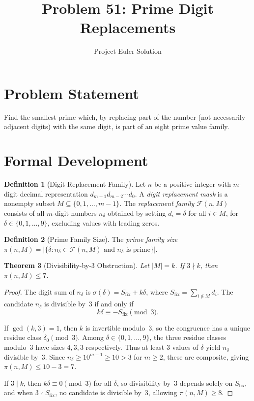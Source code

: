 \documentclass[12pt]{article}
\title{Problem 51: Prime Digit Replacements}
\author{Project Euler Solution}
\date{}
\newtheorem{theorem}{Theorem}
\theoremstyle{definition}
\newtheorem{definition}[theorem]{Definition}
\begin{document}
\maketitle

\section{Problem Statement}
Find the smallest prime which, by replacing part of the number (not necessarily adjacent digits) with the same digit, is part of an eight prime value family.

\section{Formal Development}

\begin{definition}[Digit Replacement Family]
Let $n$ be a positive integer with $m$-digit decimal representation $d_{m-1} d_{m-2} \cdots d_0$. A \emph{digit replacement mask} is a nonempty subset $M \subseteq \{0, 1, \ldots, m-1\}$. The \emph{replacement family} $\mathcal{F}(n, M)$ consists of all $m$-digit numbers $n_\delta$ obtained by setting $d_i = \delta$ for all $i \in M$, for $\delta \in \{0, 1, \ldots, 9\}$, excluding values with leading zeros.
\end{definition}

\begin{definition}[Prime Family Size]
The \emph{prime family size} $\pi(n, M) = |\{\delta : n_\delta \in \mathcal{F}(n, M) \text{ and } n_\delta \text{ is prime}\}|$.
\end{definition}

\begin{theorem}[Divisibility-by-3 Obstruction]
\label{thm:div3}
Let $|M| = k$. If $3 \nmid k$, then $\pi(n, M) \leq 7$.
\end{theorem}

\begin{proof}
The digit sum of $n_\delta$ is $\sigma(\delta) = S_{\mathrm{fix}} + k\delta$, where $S_{\mathrm{fix}} = \sum_{i \notin M} d_i$. The candidate $n_\delta$ is divisible by~3 if and only if
\[
k\delta \equiv -S_{\mathrm{fix}} \pmod{3}.
\]

If $\gcd(k, 3) = 1$, then $k$ is invertible modulo~3, so the congruence has a unique residue class $\delta_0 \pmod{3}$. Among $\delta \in \{0, 1, \ldots, 9\}$, the three residue classes modulo~3 have sizes $4, 3, 3$ respectively. Thus at least 3 values of $\delta$ yield $n_\delta$ divisible by~3. Since $n_\delta \geq 10^{m-1} \geq 10 > 3$ for $m \geq 2$, these are composite, giving $\pi(n, M) \leq 10 - 3 = 7$.

If $3 \mid k$, then $k\delta \equiv 0 \pmod{3}$ for all $\delta$, so divisibility by~3 depends solely on $S_{\mathrm{fix}}$, and when $3 \nmid S_{\mathrm{fix}}$, no candidate is divisible by~3, allowing $\pi(n, M) \geq 8$.
\end{proof}
\end{document}
